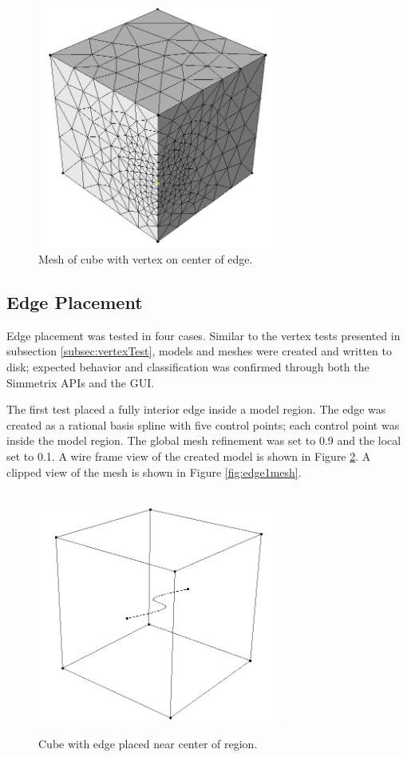 \documentclass[a4paper, 12pt]{article}
\begin{document}
\begin{figure}[H]
  \centering
  \includegraphics[width=8cm, height=8cm]{test5_sms}
  \caption{Mesh of cube with vertex on center of edge.}
  \label{fig:vert3mesh}
\end{figure}

\subsection{Edge Placement} \label{subsec:edgeTest}
Edge placement was tested in four cases. Similar to the vertex tests 
presented in subsection \ref{subsec:vertexTest}, models and meshes
were created and written to disk; expected behavior and classification
was confirmed through both the Simmetrix APIs and the GUI.

The first test placed a fully interior edge inside a model region. 
The edge was created as a rational basis spline with five control points; 
each control point was inside the model region.
The global mesh refinement was set to 0.9 and the local set to 0.1. 
A wire frame view of the created model is shown in Figure \ref{fig:edge1model}.
A clipped view of the mesh is shown in Figure \ref{fig:edge1mesh}.

\begin{figure}[H]
  \centering
  \includegraphics[width=8cm, height=8cm]{test6_smd}
  \caption{Cube with edge placed near center of region.}
  \label{fig:edge1model}
\end{figure}
\end{document}
